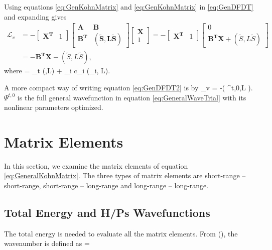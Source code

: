 \documentclass[Dissertation.tex]{subfiles}
\begin{document}
\noindent Using equations \ref{eq:GenKohnMatrix} and \ref{eq:GenKohnMatrix} in \ref{eq:GenDFDT} and expanding gives
\begin{align}
\label{eq:GenDFDT2}
\nonumber \mathcal{L}_v &= - 
\begin{bmatrix}
\boldsymbol{X^T} & 1 
\end{bmatrix}
\begin{bmatrix}
\boldsymbol{A} & \boldsymbol{B} \\
\boldsymbol{B^T} & \boldsymbol{(\tilde{S},L\tilde{S})}
\end{bmatrix}
\begin{bmatrix}
\boldsymbol{X} \\
1
\end{bmatrix}
= -
\begin{bmatrix}
\boldsymbol{X^T} & 1 
\end{bmatrix}
\begin{bmatrix}
0 \\
\boldsymbol{B^T X} + (\tilde{S},L\tilde{S})
\end{bmatrix} \\
&= -\boldsymbol{B^T X} - (\tilde{S},L\tilde{S}),
\end{align}
where
\beq
{} = _t (,L) + \sum_i c_i (\tilde{\phi}_i, L).
\eeq

\noindent A more compact way of writing equation \ref{eq:GenDFDT2} is by
\beq
{}_v = -\left( \Psi^{t,0},L  \right).
\eeq
$\Psi^{t,0}$ is the full general wavefunction in equation \ref{eq:GeneralWaveTrial} with its nonlinear parameters optimized.



\section{Matrix Elements}
In this section, we examine the matrix elements of equation \ref{eq:GeneralKohnMatrix}. The three types of matrix elements are short-range -- short-range, short-range -- long-range and long-range -- long-range.

\subsection{Total Energy and H/Ps Wavefunctions}
The total energy is needed to evaluate all the matrix elements. From (\cite{}), the wavenumber is defined as
\beq
\kappa = 
\label{eq:Wavenumber}
\eeq
\end{document}
